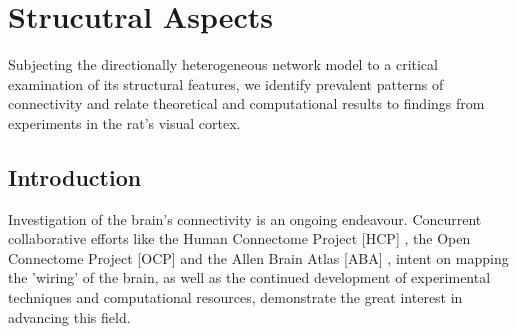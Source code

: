 \chapter{Strucutral Aspects}\label{ch:Strucutral Aspects} %
Subjecting the directionally heterogeneous network model to a critical
examination of its structural features, we identify prevalent
patterns of connectivity and relate theoretical and computational
results to findings from experiments in the rat's visual cortex.

\section{Introduction}



             

Investigation 
  of the brain's connectivity is an ongoing endeavour.  Concurrent
  collaborative efforts like the Human Connectome Project
  [\textcolor{linkgrey}{HCP}]%
  , the Open Connectome Project [\textcolor{linkgrey}{OCP}]%
  and the Allen Brain Atlas [\textcolor{linkgrey}{ABA}]%
  , intent on mapping the 'wiring' of the brain, as well as the
  continued development of experimental techniques and computational
  resources, demonstrate the
  great interest in advancing this field.

